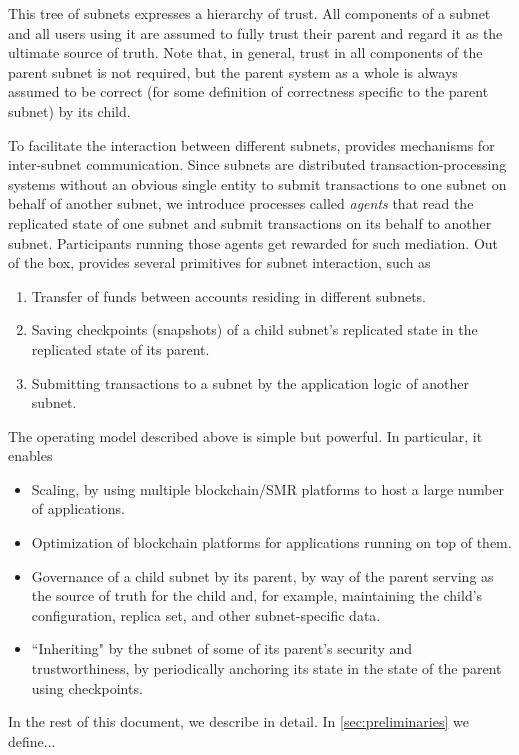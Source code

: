 This tree of subnets expresses a hierarchy of trust.
All components of a subnet and all users using it are assumed to fully trust their parent and regard it as the ultimate source of truth.
Note that, in general, trust in all components of the parent subnet is not required, but the parent system as a whole is always assumed to be correct (for some definition of correctness specific to the parent subnet) by its child.

To facilitate the interaction between different subnets, \ipc provides mechanisms for inter-subnet communication.
Since subnets are distributed transaction-processing systems
without an obvious single entity to submit transactions to one subnet on behalf of another subnet,
we introduce processes called \emph{\ipc agents} that read the replicated state of one subnet and submit transactions on its behalf to another subnet.
Participants running those \ipc agents get rewarded for such mediation.
Out of the box, \ipc provides several primitives for subnet interaction, such as
\begin{enumerate}
    \item Transfer of funds between accounts residing in different subnets.
    \item Saving checkpoints (snapshots) of a child subnet's replicated state in the replicated state of its parent.
    \item Submitting transactions to a subnet by the application logic of another subnet.
\end{enumerate}

The operating model described above is simple but powerful.
In particular, it enables
\begin{itemize}
    \item Scaling, by using multiple blockchain/SMR platforms to host a large number of applications.
    \item Optimization of blockchain platforms for applications running on top of them.
    \item Governance of a child subnet by its parent, by way of the parent serving as the source of truth for the child and, for example, maintaining the child's configuration, replica set, and other subnet-specific data.
    \item ``Inheriting" by the subnet of some of its parent's security and trustworthiness, by periodically anchoring its state in the state of the parent using checkpoints.
\end{itemize}

In the rest of this document, we describe \ipc in detail.
In \cref{sec:preliminaries} we define...
